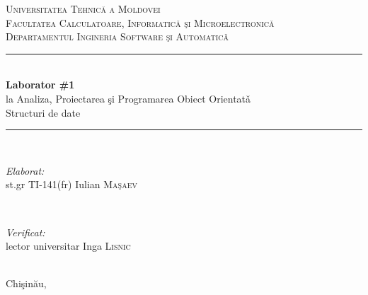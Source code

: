 \documentclass[12pt]{article}
\begin{document}
\begin{titlepage}

\newcommand{\HRule}{\rule{\linewidth}{0.5mm}} 

\center 
 

\textsc{\LARGE Universitatea Tehnic\u{a} a Moldovei}\\[0.8cm] 
\textsc{\Large Facultatea Calculatoare, Informatic\u{a} \c{s}i Microelectronic\u{a}}\\[0.5cm] 
\textsc{\large Departamentul Ingineria Software \c{s}i Automatic\v{a}}\\[5.2cm] 

\HRule \\[0.4cm]
{ \huge \bfseries Laborator \#1}\\[0.3cm]
{\large la Analiza, Proiectarea \c{s}i Programarea Obiect Orientat\v{a}}\\
{\large Structuri de date}\\[0.4cm] 
\HRule \\[5.5cm]
 

\begin{minipage}{0.4\textwidth}
\begin{flushleft} \large
\emph{Elaborat:}\\
st.gr TI-141(fr) Iulian \textsc{Ma\c{s}aev} 
\end{flushleft}
\end{minipage}
~
\begin{minipage}{0.4\textwidth}
\begin{flushright} \large
\emph{Verificat:} \\
lector universitar Inga \textsc{Lisnic} 
\end{flushright}
\end{minipage}\\[4cm]


\vfill 
{\large Chi\c{s}in\u{a}u, \the\year}\\[3cm] 



\end{titlepage}

%


%


\end{document}
